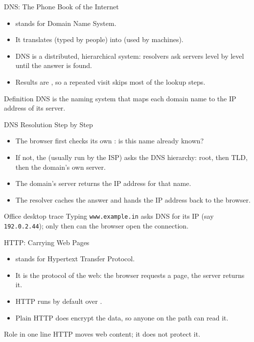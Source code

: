 \documentclass[aspectratio=169]{beamer}
\begin{document}
\begin{frame}{DNS: The Phone Book of the Internet}
  \begin{itemize}
    \item {} stands for Domain Name System.
    \item It translates  (typed by people) into  (used by machines).
    \item DNS is a distributed, hierarchical system: resolvers ask servers
      level by level until the answer is found.
    \item Results are , so a repeated visit skips most of the
      lookup steps.
  \end{itemize}
  \begin{block}{Definition}
    DNS is the naming system that maps each domain name to the IP address
    of its server.
  \end{block}
\end{frame}

\begin{frame}{DNS Resolution Step by Step}
  \begin{itemize}
    \item The browser first checks its own : is this name already
      known?
    \item If not, the  (usually run by the ISP) asks the DNS
      hierarchy: root, then TLD, then the domain's own server.
    \item The domain's server returns the  IP address for
      that name.
    \item The resolver caches the answer and hands the IP address back to
      the browser.
  \end{itemize}
  \begin{exampleblock}{Office desktop trace}
    Typing \texttt{www.example.in} asks DNS for its IP (say
    \texttt{192.0.2.44}); only then can the browser open the connection.
  \end{exampleblock}
\end{frame}

\begin{frame}{HTTP: Carrying Web Pages}
  \begin{itemize}
    \item {} stands for Hypertext Transfer Protocol.
    \item It is the  protocol of the web: the browser
      requests a page, the server returns it.
    \item HTTP runs by default over .
    \item Plain HTTP does  encrypt the data, so anyone on the path
      can read it.
  \end{itemize}
  \begin{block}{Role in one line}
    HTTP moves web content; it does not protect it.
  \end{block}
\end{frame}
\end{document}
